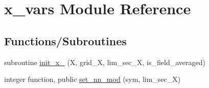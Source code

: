 \hypertarget{namespacex__vars}{}\section{x\+\_\+vars Module Reference}
\label{namespacex__vars}
\subsection*{Functions/\+Subroutines}
\begin{DoxyCompactItemize}
\item 
subroutine \hyperlink{namespacex__vars_a0cf9a4b9bd7874815cf0cbf9bf858918}{init\+\_\+x\+\_} (X, grid\+\_\+X, lim\+\_\+sec\+\_\+X, is\+\_\+field\+\_\+averaged)
\item 
integer function, public \hyperlink{namespacex__vars_a90d744aee4358a8cc35d29304d1bb120}{set\+\_\+nn\+\_\+mod} (sym, lim\+\_\+sec\+\_\+X)
\end{DoxyCompactItemize}
